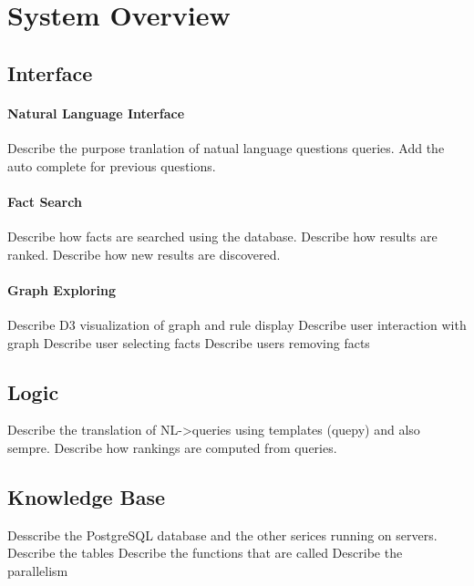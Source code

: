 
\section{System Overview}


\subsection{Interface}

\paragraph{Natural Language Interface}
Describe the purpose tranlation of natual language questions queries.
Add the auto complete for previous questions.
\paragraph{Fact Search}
Describe how facts are searched using the database.
Describe how results are ranked.
Describe how new results are discovered.
\paragraph{Graph Exploring}
Describe D3 visualization of graph and rule display
Describe user interaction with graph
Describe user selecting facts
Describe users removing facts


\subsection{Logic}
Describe the translation of NL->queries using templates (quepy) and also sempre.
Describe how rankings are computed from queries.

\subsection{Knowledge Base}

Desscribe the PostgreSQL database and the other serices running on servers.
Describe the tables 
Describe the functions that are called
Describe the parallelism





